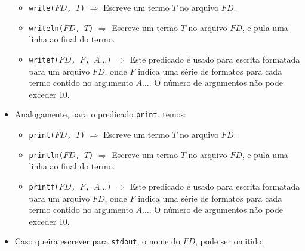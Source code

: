 \begin{frame}[c,allowframebreaks]
\begin{itemize}
\begin{itemize}
\item \texttt{write($FD$, $T$)} $\Rightarrow$ Escreve um termo $T$ no arquivo 
$FD$.

\item \texttt{writeln($FD$, $T$)} $\Rightarrow$ Escreve um termo $T$ no arquivo 
$FD$, e pula uma linha ao final do termo.

\item \texttt{writef($FD$, $F$, $A\ldots$)} $\Rightarrow$ Este predicado é usado 
para escrita formatada para um arquivo $FD$, onde $F$ indica uma série de 
formatos para cada termo contido no argumento $A\ldots$. O número de argumentos 
não pode exceder 10.

\end{itemize}
        
\framebreak
        
\item Analogamente, para o predicado \texttt{print}, temos:

\begin{itemize}

  \item \texttt{print($FD$, $T$)} $\Rightarrow$ Escreve um termo $T$ no arquivo 
  $FD$.
  
  \item \texttt{println($FD$, $T$)} $\Rightarrow$ Escreve um termo $T$ no arquivo 
  $FD$, e pula uma linha ao final do termo.
  
  \item \texttt{printf($FD$, $F$, $A\ldots$)} $\Rightarrow$ Este predicado é usado 
  para escrita formatada para um arquivo $FD$, onde $F$ indica uma série de 
  formatos para cada termo contido no argumento $A\ldots$. O número de argumentos 
  não pode exceder 10.

\end{itemize}

\item Caso queira escrever para \texttt{stdout}, o nome do  $FD$, pode ser omitido.

\end{itemize}
    
\end{frame}


